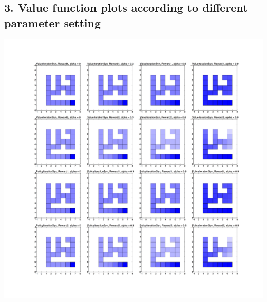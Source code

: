 \documentclass[12pt,a4paper,titlepage]{article}
\begin{document}
\subsection*{3. Value function plots according to different parameter setting}
\includegraphics[scale=0.12]{ValueFunctionPlot.jpg}
\end{document}
